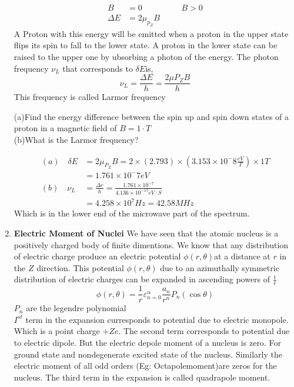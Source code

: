 \begin{enumerate}
\begin{note}
 	\begin{align*}
 	B&=0\hspace{2cm} B>0\\
 	\Delta E&=2 \mu_{p_{Z}} B
 	\end{align*}
 	A Proton with this energy will be emitted when a proton in the upper state flips its spin to fall to the lower state. A proton in the lower state can be raised to the upper one by ubsorbing a photon of the energy. The photon frequency $\nu_L$ that corresponds to $\delta E$is,\\
 	$$\nu_{L}=\frac{\Delta E}{h}=\frac{2 \mu P_{Z} B}{h}$$
 	This frequency is called Larmor frequency
\end{note}
\begin{exercise}
	 (a)\quad Find the energy difference between the spin up and spin down states of a proton in a magnetic field of $B=1\cdot T$ \\
	(b)\quad What is the Larmor frequency?
\end{exercise}
\begin{answer}
	\begin{align*}
	(a)\quad
	\delta E&=2\mu_{P_{Z}}B=2\times(2.793)\times \left(3.153\times10^-8\frac{eV}{T} \right) \times1T\\
	&=1.761\times10^-7 eV\\
	(b)\quad \nu_{L}&=\frac{\Delta e}{h}=\frac{1.761\times10^{-7}}{4.136\times10^{-15}eV\cdot S}\\
	&=4.258\times10^7Hz=42.58MHz
	\end{align*}
	Which is in the lower end of the microwave part of the spectrum.
\end{answer}
\item \textbf{Electric Moment of Nuclei}
We have seen that the atomic nucleus is a positively charged body of finite dimentions. We know that any distribution of electric charge produce an electric potential $\phi(r,\theta)$at a distance at $r$ in the $Z$ direction. This potential $\phi(r,\theta)$ due to an azimuthally symmetric distribution of electric charges can be expanded in ascending powers of $\frac{1}{r}$
$$\phi(r,\theta)=\frac{1}{r}\varepsilon^\alpha_{n=0}\frac{a_n}{r^n}P_n(\cos\theta)$$
$P_n$ are the legendre polynomial\\
$I^{st}$ term in the expansion curresponds to potential due to electric monopole. Which is a point charge $+Ze$. The second term corresponds to potential due to electric dipole. But the electric depole moment of a nucleus is zero. For ground state and nondegenerate excited state of the nucleus. Similarly the electric moment of all odd orders (Eg: Octapolemoment)are zeros for the nucleus. The third term in the expansion is called quadrapole moment.

\end{enumerate}
